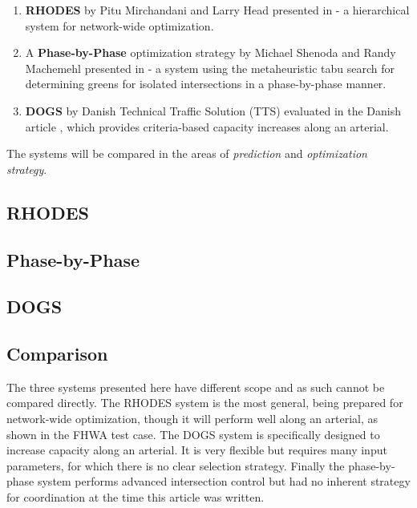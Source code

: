 \begin{enumerate}
\item \textbf{RHODES} by Pitu Mirchandani and Larry Head presented in
\citet{44} - a hierarchical system for network-wide optimization.

\item A \textbf{Phase-by-Phase} optimization strategy by Michael
Shenoda and Randy Machemehl presented in \citet{1} - a system using the
metaheuristic tabu search for determining greens for isolated
intersections in a phase-by-phase manner.

\item \textbf{DOGS} by Danish Technical Traffic Solution (TTS)
evaluated in the Danish article \citet{dogs}, which provides
criteria-based capacity increases along an arterial.

\end{enumerate}

The systems will be compared in the areas of \textit{prediction} and
\textit{optimization strategy}.

\subsection{RHODES}


\subsection{Phase-by-Phase}


\subsection{DOGS}


\subsection{Comparison}

The three systems presented here have different scope and as such
cannot be compared directly. The RHODES system is the most general,
being prepared for network-wide optimization, though it will perform
well along an arterial, as shown in the FHWA test case. The DOGS
system is specifically designed to increase capacity along an
arterial. It is very flexible but requires many input parameters, for
which there is no clear selection strategy. Finally the phase-by-phase
system performs advanced intersection control but had no inherent
strategy for coordination at the time this article was written.


